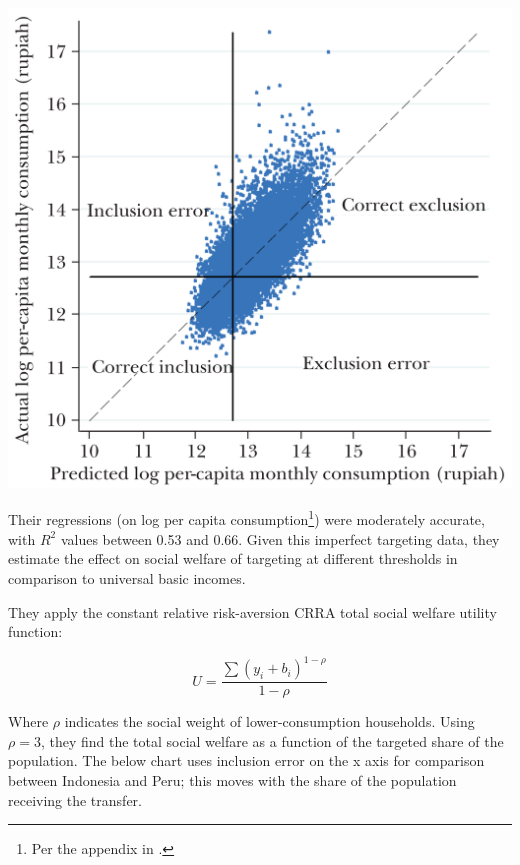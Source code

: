 \documentclass[12pt]{article}
\begin{document}
\begin{center}
	\includegraphics[width=15cm]{../img/hanna_olken_2018_pred_actual_cons}
	\captionsetup{justification=centering}
	\label{fig:ho_pred_actual_cons}
\end{center}

Their regressions (on log per capita
consumption\footnote{Per the appendix in .})
were moderately accurate, with $R^2$ values between 0.53 and 0.66.
Given this imperfect targeting data, they estimate the effect on social
welfare of targeting at different thresholds in comparison to universal basic
incomes.

They apply the constant relative risk-aversion CRRA total social welfare 
utility function:

\begin{equation}
U = \frac{\sum{(y_i + b_i)^{1-\rho}}}{1-\rho}
\end{equation}

Where $\rho$ indicates the social weight of lower-consumption households.
Using $\rho = 3$, they find the total social welfare as a function 
of the targeted share of the population. The below chart uses inclusion error 
on the x axis for comparison between Indonesia and Peru; this moves with the 
share of the population receiving the transfer.
\end{document}
